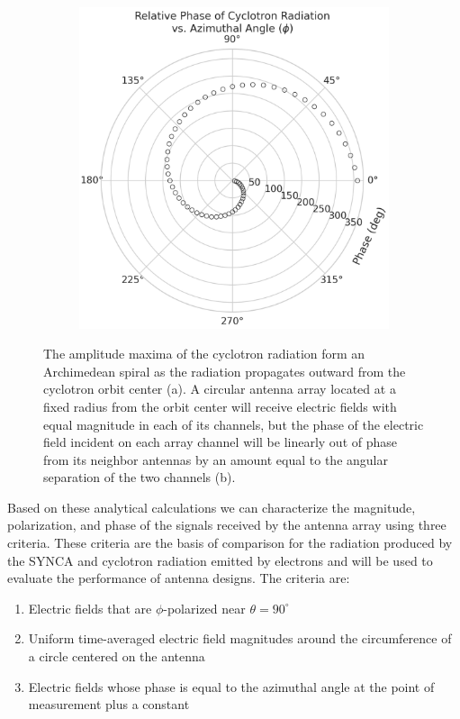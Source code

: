 \begin{figure}[h]
\begin{subfigure}[b]{0.48\textwidth}
        \includegraphics[width=.9\textwidth]{figs/Chapter-5/221012_cyclotron_array_spiral_relative.png}
        \caption{\label{fig:array-sprial}}
    \end{subfigure}
    \hfill
    \caption{ The amplitude maxima of the cyclotron radiation form an Archimedean spiral as the radiation propagates outward from the cyclotron orbit center (a). A circular antenna array located at a fixed radius from the orbit center will receive electric fields with equal magnitude in each of its channels, but the phase of the electric field incident on each array channel will be linearly out of phase from its neighbor antennas by an amount equal to the angular separation of the two channels (b).}
    \qquad
\end{figure}

Based on these analytical calculations we can characterize the magnitude, polarization, and phase of the signals received by the antenna array using three criteria. These criteria are the basis of comparison for the radiation produced by the SYNCA and cyclotron radiation emitted by electrons and will be used to evaluate the performance of antenna designs. The criteria are:
\begin{enumerate}
    \item Electric fields that are $\phi$-polarized near $\theta=90^\circ$
    \item Uniform time-averaged electric field magnitudes around the circumference of a circle centered on the antenna
    \item Electric fields whose phase is equal to the azimuthal angle at the point of measurement plus a constant
\end{enumerate}

